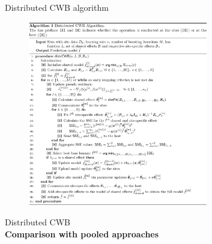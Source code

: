 \documentclass[t,10pt]{beamer}
\newcommand{\fSlide}[2]{
\begin{frame}[plain]{}%
  \vspace{4cm}%
  \Large #1\\[0.2cm]%
  {\LARGE\textbf{#2}}%
	\addtocounter{framenumber}{-1}%
\end{frame}%
}
\begin{document}
\begin{frame}{Distributed CWB algorithm}
   \begin{figure}
       \centering\vspace{-0.2cm}
       \includegraphics[width=0.7\textwidth]{figures/fig-dcwb.png}
   \end{figure} 
\end{frame}

\fSlide{Distributed CWB}{Comparison with pooled approaches}

\end{document}
